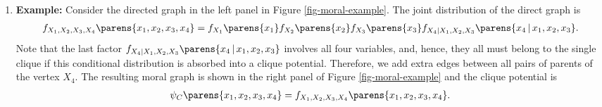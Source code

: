 \documentclass[12pt]{article}
\begin{document}
\begin{enumerate}[label=\textbf{\arabic*.}]
	\item \textbf{Example:} Consider the directed graph in the left panel in Figure \ref{fig-moral-example}. The joint distribution of the direct graph is 
	\begin{align*}
		f_{X_1, X_2, X_3, X_4} \parens{x_1, x_2, x_3, x_4} = f_{X_1} \parens{x_1} f_{X_2} \parens{x_2} f_{X_3} \parens{x_3} f_{X_4 \vert X_1, X_2, X_3} \parens{x_4 \,\vert\, x_1, x_2, x_3}. 
	\end{align*}
	Note that the last factor $f_{X_4 \vert X_1, X_2, X_3} \parens{x_4 \,\vert\, x_1, x_2, x_3}$ involves all four variables, and, hence, they all must belong to the single clique if this conditional distribution is absorbed into a clique potential. Therefore, we add extra edges between all pairs of parents of the vertex $X_4$. The resulting moral graph is shown in the right panel of Figure \ref{fig-moral-example} and the clique potential is 
	\begin{align*}
		\psi_C \parens{x_1, x_2, x_3, x_4} = f_{X_1, X_2, X_3, X_4} \parens{x_1, x_2, x_3, x_4}. 
	\end{align*}
	

\end{enumerate}
\end{document}
